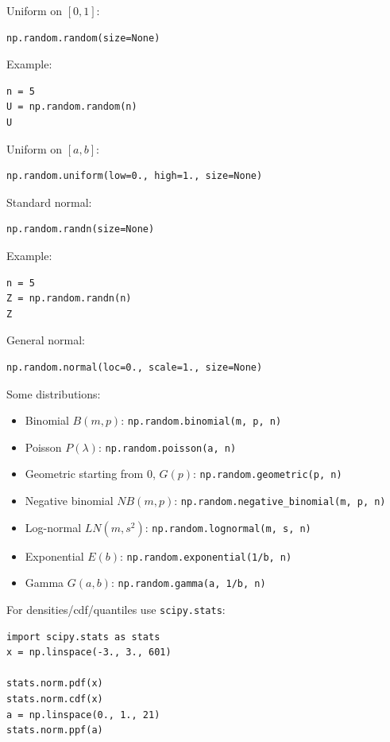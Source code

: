 \documentclass[11pt]{article}
\begin{document}
Uniform on $[0,1]$:
\begin{lstlisting}
np.random.random(size=None)
\end{lstlisting}

Example:
\begin{lstlisting}
n = 5
U = np.random.random(n)
U
\end{lstlisting}

Uniform on $[a,b]$:
\begin{lstlisting}
np.random.uniform(low=0., high=1., size=None)
\end{lstlisting}

Standard normal:
\begin{lstlisting}
np.random.randn(size=None)
\end{lstlisting}

Example:
\begin{lstlisting}
n = 5
Z = np.random.randn(n)
Z
\end{lstlisting}

General normal:
\begin{lstlisting}
np.random.normal(loc=0., scale=1., size=None)
\end{lstlisting}

Some distributions:
\begin{itemize}
\item Binomial $B(m,p)$: \texttt{np.random.binomial(m, p, n)}
\item Poisson $P(\lambda)$: \texttt{np.random.poisson(a, n)}
\item Geometric starting from $0$, $G(p)$: \texttt{np.random.geometric(p, n)}
\item Negative binomial $NB(m,p)$: \texttt{np.random.negative\_binomial(m, p, n)}
\item Log-normal $LN(m,s^2)$: \texttt{np.random.lognormal(m, s, n)}
\item Exponential $E(b)$: \texttt{np.random.exponential(1/b, n)}
\item Gamma $G(a,b)$: \texttt{np.random.gamma(a, 1/b, n)}
\end{itemize}

For densities/cdf/quantiles use \texttt{scipy.stats}:
\begin{lstlisting}
import scipy.stats as stats
x = np.linspace(-3., 3., 601)

stats.norm.pdf(x)
stats.norm.cdf(x)
a = np.linspace(0., 1., 21)
stats.norm.ppf(a)
\end{lstlisting}

\newpage
\end{document}
